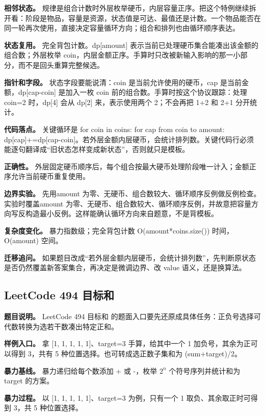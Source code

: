 \textbf{相邻状态。} 规律是组合计数时外层枚举硬币，内层容量正序。把这个特例继续拆开看：阶段是物品，容量是资源，状态值是可达、最值还是计数。一个物品能否在同一轮再次使用，直接决定容量循环方向；组合和排列也由循环顺序表达。

\textbf{状态复用。} 完全背包计数。dp[amount] 表示当前已处理硬币集合能凑出该金额的组合数；外层枚举 coin，内层金额正序。手算时只改被新输入影响的那一小部分，而不是回头重算完整候选。

\textbf{指针和字段。} 状态字段要能说清：coin 是当前允许使用的硬币，cap 是当前金额，dp[cap-coin] 是加入一枚 coin 前的组合数。手算时按这个协议跟踪：处理 coin=2 时，dp[4] 会从 dp[2] 来，表示使用两个 2；不会再把 1+2 和 2+1 分开统计。

\textbf{代码落点。} 关键循环是 for coin in coins: for cap from coin to amount: dp[cap]+=dp[cap-coin]。若外层金额内层硬币，会统计排列数。关键代码行必须能逐句翻译成“旧状态怎样变成新状态”，否则就只是模板。

\textbf{正确性。} 外层固定硬币顺序后，每个组合按最大硬币处理阶段唯一计入；金额正序允许当前硬币重复使用。

\textbf{边界实验。} 先用amount 为零、无硬币、组合数较大、循环顺序反例做反例检查。实验时覆盖amount 为零、无硬币、组合数较大、循环顺序反例，并故意把容量方向写反构造最小反例。这样能确认循环方向来自题意，不是背模板。

\textbf{复杂度变化。} 暴力指数级；完全背包计数 O(amount*coins.size()) 时间，O(amount) 空间。

\textbf{迁移追问。} 如果题目改成“若外层金额内层硬币，会统计排列数”，先判断原状态是否仍然覆盖新答案集合，再决定是微调边界、改 value 语义，还是换算法。

\subsection{LeetCode 494 目标和}

\textbf{题目说明。} LeetCode 494 目标和 的题面入口要先还原成具体任务：正负号选择可代数转换为选若干数凑出特定正和。

\textbf{样例入口。} 拿 [1, 1, 1, 1, 1]、target=3 手算，给其中一个 1 加负号，其余为正可以得到 3，共有 5 种位置选择。也可转成选正数子集和为 (sum+target)/2。

\textbf{暴力基线。} 暴力递归给每个数添加 + 或 -，枚举 \ensuremath{2^{n}} 个符号序列并统计和为 target 的方案。

\textbf{暴力过程。} 以 [1, 1, 1, 1, 1]、target=3 为例，只有一个 1 取负、其余取正时可得到 3，共 5 种位置选择。

